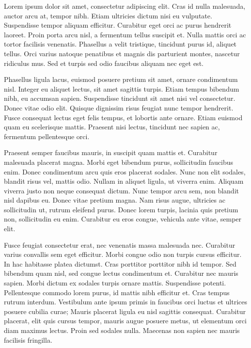 \documentclass[
]{article}
\begin{document}
Lorem ipsum dolor sit amet, consectetur adipiscing elit. Cras id nulla malesuada, auctor arcu at, tempor nibh. Etiam ultricies dictum nisi eu vulputate. Suspendisse tempor aliquam efficitur. Curabitur eget orci ac purus hendrerit laoreet. Proin porta arcu nisl, a fermentum tellus suscipit et. Nulla mattis orci ac tortor facilisis venenatis. Phasellus a velit tristique, tincidunt purus id, aliquet tellus. Orci varius natoque penatibus et magnis dis parturient montes, nascetur ridiculus mus. Sed et turpis sed odio faucibus aliquam nec eget est.

Phasellus ligula lacus, euismod posuere pretium sit amet, ornare condimentum nisl. Integer eu aliquet lectus, sit amet sagittis turpis. Etiam tempus bibendum nibh, eu accumsan sapien. Suspendisse tincidunt sit amet nisi vel consectetur. Donec vitae odio elit. Quisque dignissim risus feugiat nunc tempor hendrerit. Fusce consequat lectus eget felis tempus, et lobortis ante ornare. Etiam euismod quam eu scelerisque mattis. Praesent nisi lectus, tincidunt nec sapien ac, fermentum pellentesque orci.

Praesent semper faucibus mauris, in suscipit quam mattis et. Curabitur malesuada placerat magna. Morbi eget bibendum purus, sollicitudin faucibus enim. Donec condimentum arcu quis eros placerat sodales. Nunc non elit sodales, blandit risus vel, mattis odio. Nullam in aliquet ligula, ut viverra enim. Aliquam viverra justo non neque consequat dictum. Nunc tempor arcu sem, non blandit nisl dapibus eu. Donec vitae pretium magna. Nam risus augue, ultricies ac sollicitudin ut, rutrum eleifend purus. Donec lorem turpis, lacinia quis pretium non, sollicitudin eu enim. Curabitur eu eros congue, vehicula ante vitae, semper elit.

Fusce feugiat consectetur erat, nec venenatis massa malesuada nec. Curabitur varius convallis sem eget efficitur. Morbi congue odio non turpis cursus efficitur. In hac habitasse platea dictumst. Cras porttitor porttitor nibh id tempor. Sed bibendum quam nisl, sed congue lectus condimentum et. Curabitur nec mauris sapien. Morbi dictum ex sodales turpis ornare mattis. Suspendisse potenti. Pellentesque commodo lorem purus, id mattis nibh efficitur et. Cras tempus rutrum interdum. Vestibulum ante ipsum primis in faucibus orci luctus et ultrices posuere cubilia curae; Mauris placerat ligula eu nisl sagittis consequat. Curabitur placerat, elit quis cursus tempor, mauris augue posuere metus, ut elementum orci diam maximus lectus. Proin sed sodales nulla. Maecenas non sapien nec mauris facilisis fringilla.
\end{document}
